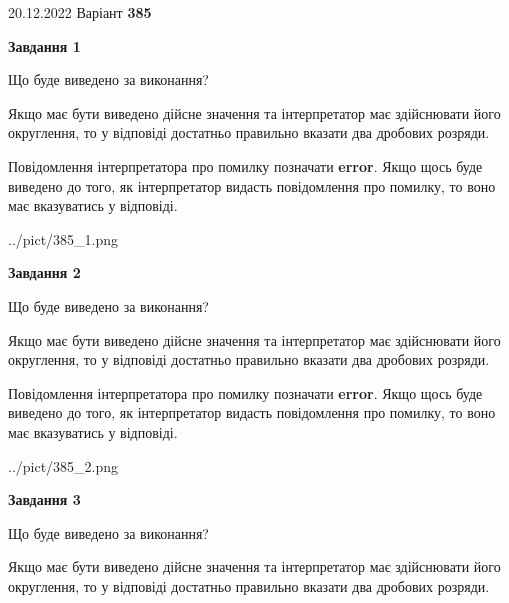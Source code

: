 \documentclass[12pt, ukrainian]{article}
\begin{document}
{20.12.2022 Варіант \No \textbf { 385 }\par}
{
\begin {Large}

{\begin {center}\textbf{Завдання 1}\end {center}}\par
Що буде виведено за виконання? \par

Якщо має бути виведено дійсне значення та інтерпретатор має здійснювати його округлення, 
то у відповіді достатньо правильно вказати два дробових розряди.

Повідомлення інтерпретатора про помилку позначати \textbf{error}.
Якщо щось буде виведено до того, як інтерпретатор видасть повідомлення про помилку, 
то воно має вказуватись у відповіді. \par

\begin{center}
	{../pict/385_1.png}
\end{center}
\newpage

{\begin {center}\textbf{Завдання 2}\end {center}}\par
Що буде виведено за виконання? \par

Якщо має бути виведено дійсне значення та інтерпретатор має здійснювати його округлення, 
то у відповіді достатньо правильно вказати два дробових розряди.

Повідомлення інтерпретатора про помилку позначати \textbf{error}.
Якщо щось буде виведено до того, як інтерпретатор видасть повідомлення про помилку, 
то воно має вказуватись у відповіді. \par

\begin{center}
	{../pict/385_2.png}
\end{center}
\newpage

{\begin {center}\textbf{Завдання 3}\end {center}}\par
Що буде виведено за виконання? \par

Якщо має бути виведено дійсне значення та інтерпретатор має здійснювати його округлення, 
то у відповіді достатньо правильно вказати два дробових розряди.


\end{Large}}
\end{document}
